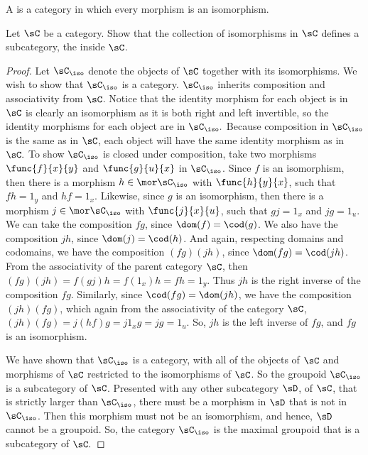 \documentclass[main.tex]{subfiles}
\begin{document}
\begin{definition}
	A  is a category in which every morphism is an isomorphism.
\end{definition}
\popthm

\begin{exercise}
	Let \(\sC\) be a category. Show that the collection of isomorphisms in
	\(\sC\) defines a subcategory, the  inside \(\sC\).
\end{exercise}

\begin{proof}
	Let \(\sC_{\iso}\) denote the objects of \(\sC\) together with its
	isomorphisms. We wish to show that \(\sC_{\iso}\) is a category.
	$\sC_{\iso}$ inherits composition and associativity from $\sC$.
	Notice that the identity morphism for each object
	is in $\sC$ is clearly an isomorphism as it is both right and left
	invertible, so the identity morphisms for each object are in $\sC_{\iso}.$
	Because composition in $\sC_{\iso}$ is the same as in $\sC$, each object
	will have the same identity morphism as in $\sC.$
	To show $\sC_{\iso}$ is closed under composition, take two morphisms
	\(\func{f}{x}{y}\) and \(\func{g}{u}{x}\)
	in \(\sC_{\iso}\). Since \(f\) is an isomorphism, then there is a morphism
	\(h\in\mor\sC_{\iso}\) with \(\func{h}{y}{x}\), such that \(fh=1_y\) and
	\(hf=1_x\). Likewise, since \(g\) is an isomorphism, then there is a
	morphism \(j\in\mor\sC_{\iso}\) with \(\func{j}{x}{u}\), such that \(gj=1_x\)
	and \(jg=1_u\). We can take the composition \(fg\), since
	\(\dom(f)=\cod(g)\). We also have the composition \(jh\), since
	\(\dom(j)=\cod(h)\). And again, respecting domains and codomains, we have
	the composition \((fg)(jh)\), since \(\dom(fg)=\cod(jh)\). From the
	associativity of the parent category \(\sC\), then
	\((fg)(jh)=f(gj)h=f(1_x)h=fh=1_y\). Thus \(jh\) is the right inverse of the
	composition \(fg\). Similarly, since \(\cod(fg)=\dom(jh)\), we have the
	composition \((jh)(fg)\), which again from the associativity of the category
	\(\sC\), \((jh)(fg)=j(hf)g=j1_xg=jg=1_u\). So, \(jh\) is the left inverse of
	\(fg\), and \(fg\) is an isomorphism.

	We have shown that \(\sC_{\iso}\) is a category, with all of the objects of
	\(\sC\) and morphisms of \(\sC\) restricted to the isomorphisms of \(\sC\).
	So the groupoid \(\sC_{\iso}\) is a subcategory of \(\sC\). Presented with
	any other subcategory \(\sD\), of \(\sC\), that is strictly larger than
	\(\sC_{\iso}\), there must be a morphism in \(\sD\) that is not in
	\(\sC_{\iso}\). Then this morphism must not be an isomorphism, and hence,
	\(\sD\) cannot be a groupoid. So, the category \(\sC_{\iso}\) is the maximal
	groupoid that is a subcategory of \(\sC.\)
\end{proof}
\end{document}
